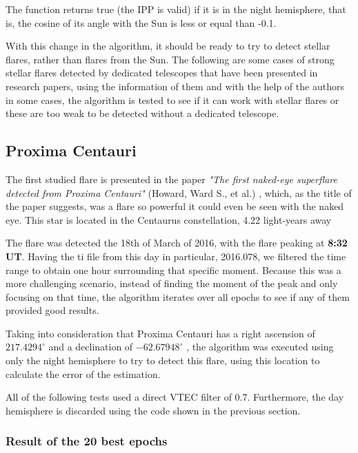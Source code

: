 The function returns true (the IPP is valid) if it is in the night hemisphere, that is, the cosine of its angle with the Sun is less or equal than -0.1.

With this change in the algorithm, it should be ready to try to detect stellar flares, rather than flares from the Sun. The following are some cases of strong stellar flares detected by dedicated telescopes that have been presented in research papers, using the information of them and with the help of the authors in some cases, the algorithm is tested to see if it can work with stellar flares or these are too weak to be detected without a dedicated telescope. 

\subsection{Proxima Centauri}

The first studied flare is presented in the paper \textit{"The first naked-eye superflare detected from Proxima Centauri"} (Howard, Ward S., et al.) \cite{howard2018first}, which, as the title of the paper suggests, was a flare so powerful it could even be seen with the naked eye. This star is located in the Centaurus constellation, 4.22 light-years away

The flare was detected the 18th of March of 2016, with the flare peaking at\textbf{ 8:32 UT}. Having the ti file from this day in particular, 2016.078, we filtered the time range to obtain one hour surrounding that specific moment. Because this was a more challenging scenario, instead of finding the moment of the peak and only focusing on that time, the algorithm iterates over all epochs to see if any of them provided good results.

Taking into consideration that Proxima Centauri has a right ascension of $217.4294^{\circ}$ and a declination of $-62.67948^{\circ}$ \cite{proximawiki}, the algorithm was executed using only the night hemisphere to try to detect this flare, using this location to calculate the error of the estimation. 

All of the following tests used a direct VTEC filter of 0.7. Furthermore, the day hemisphere is discarded using the code shown in the previous section.

\clearpage

\subsubsection{Result of the 20 best epochs}

